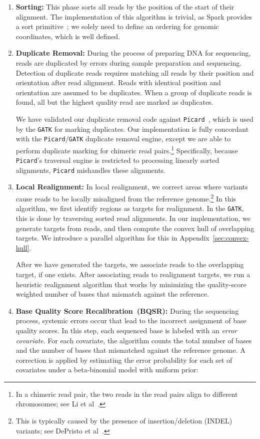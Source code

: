 \documentclass{sig-alternate}
\begin{document}
\begin{enumerate}
\item \textbf{Sorting:} This phase sorts all reads by the position of the start of their alignment. The implementation
of this algorithm is trivial, as Spark provides a sort primitive~\cite{zaharia10}; we solely need to define an
ordering for genomic coordinates, which is well defined.
\item \textbf{Duplicate Removal:} During the process of preparing DNA for sequencing, reads are duplicated by
errors during sample preparation and sequencing. Detection of duplicate reads requires matching all reads by their
position and orientation after read alignment. Reads with identical position and orientation are assumed to be
duplicates. When a group of duplicate reads is found, all but the highest quality read are marked as duplicates.

We have validated our duplicate removal code against \texttt{Picard}~\cite{picard}, which is used by the \texttt{GATK}
for marking duplicates. Our implementation is fully concordant with the \texttt{Picard}/\texttt{GATK} duplicate removal
engine, except we are able to perform duplicate marking for chimeric read pairs.\footnote{In a chimeric read pair,
the two reads in the read pairs align to different chromosomes; see Li et al~\cite{li10}.}
Specifically, because \texttt{Picard}'s traversal engine is restricted to processing linearly sorted alignments,
\texttt{Picard} mishandles these alignments.
\item \textbf{Local Realignment:} In local realignment, we correct areas where variants cause reads to be
locally misaligned from the reference genome.\footnote{This is typically caused by the presence of
insertion/deletion (INDEL) variants; see DePristo et al~\cite{depristo11}.} In this algorithm, we first identify regions
as targets for realignment. In the \texttt{GATK}, this is done by traversing sorted read alignments. In our implementation,
we generate targets from reads, and then compute the convex hull of overlapping targets. We introduce a parallel
algorithm for this in Appendix~\ref{sec:convex-hull}.

After we have generated the targets, we associate reads to the overlapping target, if one exists. After
associating reads to realignment targets, we run a heuristic realignment algorithm that works by minimizing
the quality-score weighted number of bases that mismatch against the reference.
\item \textbf{Base Quality Score Recalibration~(BQSR):} During the sequencing process, systemic errors occur
that lead to the incorrect assignment of base quality scores. In this step, each sequenced base is labeled with an
\emph{error covariate}. For each covariate, the algorithm counts the total number of bases and the number
of bases that mismatched against the reference genome. A correction is applied by estimating the error probability
for each set of covariates under a beta-binomial model with uniform prior:


\end{enumerate}
\end{document}
